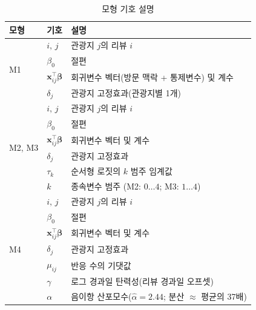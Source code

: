 \documentclass[10pt,a4paper]{article}
\begin{document}
\begin{table}[H]\centering
\caption{모형 기호 설명}
\footnotesize
\begin{tabular}{llp{8.2cm}}\toprule
\textbf{모형} & \textbf{기호} & \textbf{설명} \\ \midrule
\multirow{4}{*}{M1}
  & $i,\,j$                            & 관광지 $j$의 리뷰 $i$ \\
  & $\beta_0$                          & 절편 \\
  & $\mathbf{x}_{ij}^\top\boldsymbol\beta$ & 회귀변수 벡터(방문 맥락 + 통제변수) 및 계수 \\
  & $\delta_j$                         & 관광지 고정효과(관광지별 1개) \\ \midrule
\multirow{6}{*}{M2, M3}
  & $i,\,j$                            & 관광지 $j$의 리뷰 $i$ \\
  & $\beta_0$                          & 절편 \\
  & $\mathbf{x}_{ij}^\top\boldsymbol\beta$ & 회귀변수 벡터 및 계수 \\
  & $\delta_j$                         & 관광지 고정효과 \\
  & $\tau_k$                           & 순서형 로짓의 $k$ 범주 임계값 \\
  & $k$                                & 종속변수 범주 (M2: $0\!\dots\!4$;\; M3: $1\!\dots\!4$) \\ \midrule
\multirow{7}{*}{M4}
  & $i,\,j$                            & 관광지 $j$의 리뷰 $i$ \\
  & $\beta_0$                          & 절편 \\
  & $\mathbf{x}_{ij}^\top\boldsymbol\beta$ & 회귀변수 벡터 및 계수 \\
  & $\delta_j$                         & 관광지 고정효과 \\
  & $\mu_{ij}$                         & 반응 수의 기댓값 \\
  & $\gamma$                           & 로그 경과일 탄력성(리뷰 경과일 오프셋) \\
  & $\alpha$                           & 음이항 산포모수($\hat\alpha = 2.44$; 분산 $\approx$ 평균의 37배) \\ \bottomrule
\end{tabular}
\end{table}

\tblVariableMapKO

\tblVIF
\end{document}
